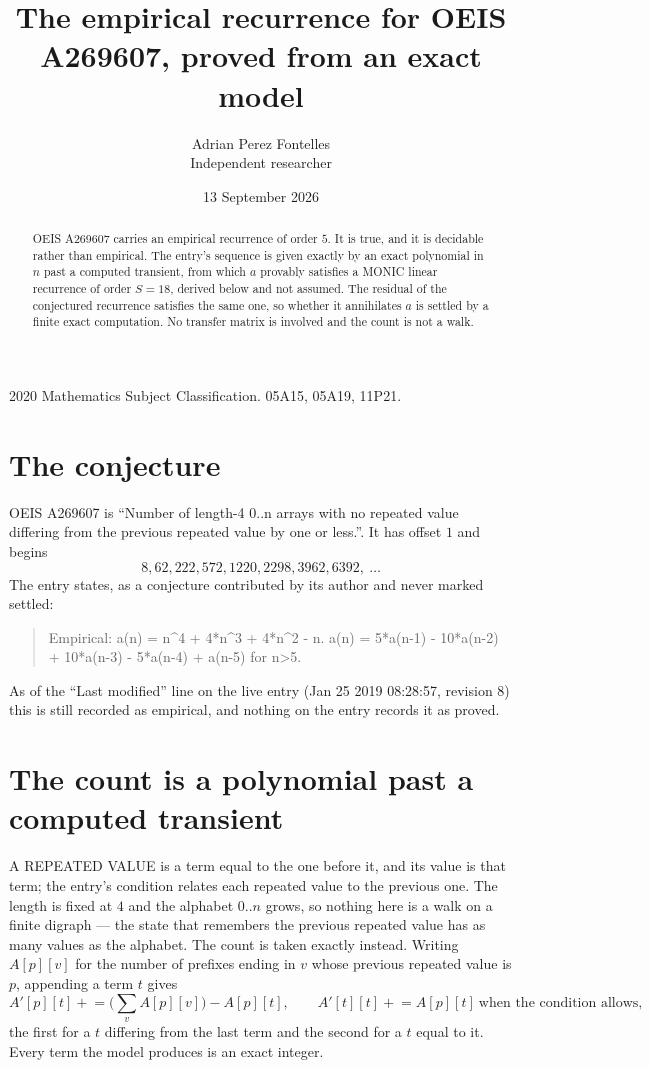 \documentclass[11pt,a4paper]{article}
\title{The empirical recurrence for OEIS A269607, proved from an exact model}
\author{Adrian Perez Fontelles\\ \small Independent researcher}
\date{13 September 2026}
\theoremstyle{plain}
\theoremstyle{definition}
\begin{document}
\maketitle

\begin{abstract}
OEIS A269607 carries an empirical recurrence of order $5$. It is true, and it is
decidable rather than empirical. The entry's sequence is given exactly by an exact polynomial in $n$ past a computed transient, from
which $a$ provably satisfies a MONIC linear recurrence of order $S=18$, derived below and not
assumed. The residual of the conjectured recurrence satisfies the same one, so whether it
annihilates $a$ is settled by a finite exact computation. No transfer matrix is involved and
the count is not a walk.
\end{abstract}

\noindent\small 2020 Mathematics Subject Classification. 05A15, 05A19, 11P21.\normalsize

\section{The conjecture}

OEIS A269607 is ``Number of length-4 0..n arrays with no repeated value differing from the previous repeated value by one or less.''. It has offset $1$ and begins
\[
8, 62, 222, 572, 1220, 2298, 3962, 6392,\ \dots
\]
The entry states, as a conjecture contributed by its author and never marked settled:
\begin{quote}
Empirical: a(n) = n\^{}4 + 4*n\^{}3 + 4*n\^{}2 - n. a(n) = 5*a(n-1) - 10*a(n-2) + 10*a(n-3) - 5*a(n-4) + a(n-5) for n>5.
\end{quote}
As of the ``Last modified'' line on the live entry (Jan 25 2019 08:28:57, revision 8)
this is still recorded as empirical, and nothing on the entry records it as proved.

\section{The count is a polynomial past a computed transient}

A REPEATED VALUE is a term equal to the one before it, and its value is that term; the entry's
condition relates each repeated value to the previous one. The length is fixed at $4$ and the
alphabet $0..n$ grows, so nothing here is a walk on a finite digraph --- the state that
remembers the previous repeated value has as many values as the alphabet. The count is taken
exactly instead. Writing $A[p][v]$ for the number of prefixes ending in $v$ whose previous
repeated value is $p$, appending a term $t$ gives
\[
A'[p][t] \mathrel{+}= \Big(\sum_v A[p][v]\Big) - A[p][t],
\qquad
A'[t][t] \mathrel{+}= A[p][t]\ \text{when the condition allows},
\]
the first for a $t$ differing from the last term and the second for a $t$ equal to it. Every
term the model produces is an exact integer.
\end{document}
